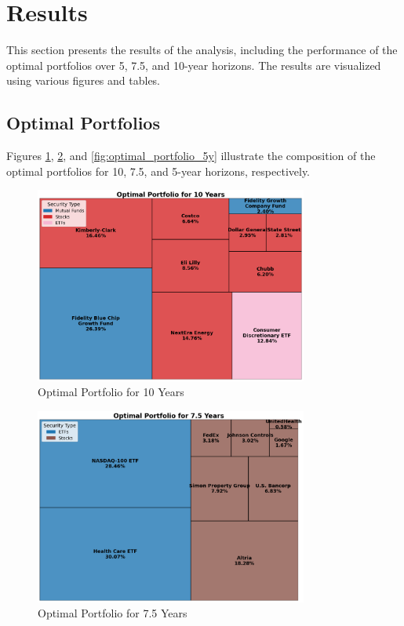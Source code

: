 \section{Results}

This section presents the results of the analysis, including the performance of the optimal portfolios over 5, 7.5, and 10-year horizons. The results are visualized using various figures and tables.

\subsection{Optimal Portfolios}
Figures \ref{fig:optimal_portfolio_10y}, \ref{fig:optimal_portfolio_7_5y}, and \ref{fig:optimal_portfolio_5y} illustrate the composition of the optimal portfolios for 10, 7.5, and 5-year horizons, respectively.

\begin{figure}[!htbp]
    \centering
    \includegraphics[width=0.8\textwidth]{../Figures/optimal_portfolio_10_years.png}
    \caption{Optimal Portfolio for 10 Years}
    \label{fig:optimal_portfolio_10y}
\end{figure}

\begin{figure}[!htbp]
    \centering
    \includegraphics[width=0.8\textwidth]{../Figures/optimal_portfolio_7_5_years.png}
    \caption{Optimal Portfolio for 7.5 Years}
    \label{fig:optimal_portfolio_7_5y}
\end{figure}

